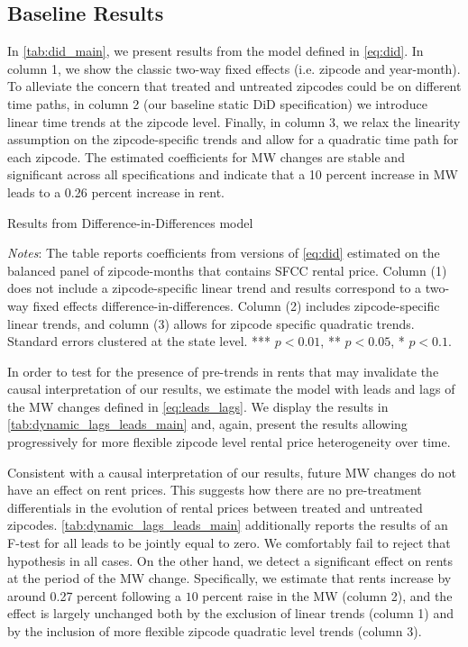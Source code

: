 \subsection{Baseline Results}\label{sec:baseline_results}

In \autoref{tab:did_main}, we present results from the model defined in \autoref{eq:did}. In 
column 1, we show the classic two-way fixed effects (i.e. zipcode and year-month). To alleviate 
the concern that treated and untreated zipcodes could be on different time paths, in column 2 
(our baseline static DiD specification) we introduce linear time trends at the zipcode level. 
Finally, in column 3, we relax the linearity assumption on the zipcode-specific trends and allow 
for a quadratic time path for each zipcode. The estimated coefficients for MW changes are stable 
and significant across all specifications and indicate that a 10 percent increase in MW leads to 
a 0.26 percent increase in rent.

\begin{table}[h!]
    \caption{Results from Difference-in-Differences model}
    \label{tab:did_main}
    \centering
    
    \begin{minipage}{0.95\textwidth} \footnotesize
		\vspace{3mm} 
		\textit{Notes}: The table reports coefficients from versions of \autoref{eq:did} estimated 
		on the balanced panel of zipcode-months that contains SFCC rental price. Column (1) does not 
		include a zipcode-specific linear trend and results correspond to a two-way fixed effects 
		difference-in-differences. Column (2) includes zipcode-specific linear trends, and column (3) 
		allows for zipcode specific quadratic trends. Standard errors clustered at the state level. 
		*** $p < 0.01$, ** $p < 0.05$, * $p < 0.1$.
	\end{minipage}
\end{table}

In order to test for the presence of pre-trends in rents that may invalidate the causal 
interpretation of our results, we estimate the model with leads and lags of the MW changes defined 
in \autoref{eq:leads_lags}. We display the results in \autoref{tab:dynamic_lags_leads_main} and, 
again, present the results allowing progressively for more flexible zipcode level rental price 
heterogeneity over time.


Consistent with a causal interpretation of our results, future MW changes do not have an effect on 
rent prices. This suggests how there are no pre-treatment differentials in the evolution of rental 
prices between treated and untreated zipcodes. \autoref{tab:dynamic_lags_leads_main} additionally 
reports the results of an F-test for all leads to be jointly equal to zero. We comfortably fail to 
reject that hypothesis in all cases. On the other hand, we detect a significant effect on rents at 
the period of the MW change. Specifically, we estimate that rents increase by around 0.27 percent 
following a $10$ percent raise in the MW (column 2), and the effect is largely unchanged both by the 
exclusion of linear trends (column 1) and by the inclusion of more flexible zipcode quadratic level 
trends (column 3).

